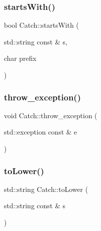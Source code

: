 \mbox{\label{namespace_catch_acad23751846ac23d0f379e34f5adebb1}} 
\subsubsection{\texorpdfstring{startsWith()}{startsWith()}\hspace{0.1cm}{\footnotesize\ttfamily [2/2]}}
{\footnotesize\ttfamily bool Catch\+::starts\+With (\begin{DoxyParamCaption}\item[{std\+::string const \&}]{s,  }\item[{char}]{prefix }\end{DoxyParamCaption})}

\mbox{\label{namespace_catch_a3cbceeab9252d1b752f66a2826e92548}} 
\subsubsection{\texorpdfstring{throw\_exception()}{throw\_exception()}}
{\footnotesize\ttfamily void Catch\+::throw\+\_\+exception (\begin{DoxyParamCaption}\item[{std\+::exception const \&}]{e }\end{DoxyParamCaption})}

\mbox{\label{namespace_catch_ac036a17412d318598ffda8e1fe7a1177}} 
\subsubsection{\texorpdfstring{toLower()}{toLower()}}
{\footnotesize\ttfamily std\+::string Catch\+::to\+Lower (\begin{DoxyParamCaption}\item[{std\+::string const \&}]{s }\end{DoxyParamCaption})}

\mbox{\label{namespace_catch_a0760dbe87d090a55a35414db57d272c4}} 
